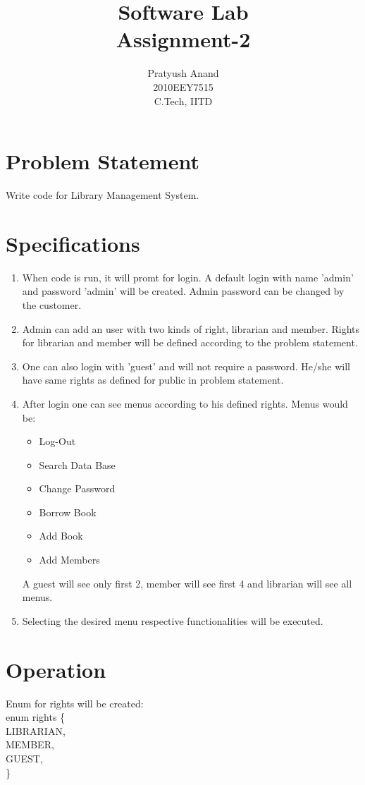 \documentclass[a4paper,10pt]{report} %
\title{Software Lab \\Assignment-2}
\author{Pratyush Anand \\2010EEY7515 \\C.Tech, IITD}
\begin{document}
  \maketitle

  \chapter{Problem Statement}
    Write code for Library Management System.

  \chapter{Specifications}
    \begin{enumerate}
      \item When code is run, it will promt for login. A default login
with name 'admin' and password 'admin' will be created. Admin password can be
changed by the customer.
      \newline
      \item Admin can add an user with two kinds of right, librarian and
member. Rights for librarian and member will be defined according to the
problem statement.
      \newline
      \item One can also login with 'guest' and will not require a
password. He/she will have same rights as defined for public in problem
statement.
      \newline
	\item After login one can see menus according to his defined
rights. Menus would be:
    \begin{itemize}
	 \item Log-Out
	 \item Search Data Base
	 \item Change Password
	 \item Borrow Book
	 \item Add Book
	 \item Add Members
    \end{itemize}
	A guest will see only first 2, member will see first 4 and librarian
will see all menus.
	\item Selecting the desired menu respective functionalities will
be executed. 
    \end{enumerate}

  \chapter{Operation}
	Enum for rights will be created:\\
	enum rights \{\\
		LIBRARIAN,\\
		MEMBER,\\
		GUEST,\\
	\}\\
\end{document}
